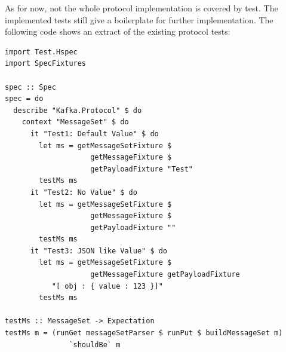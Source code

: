 As for now, not the whole protocol implementation is
covered by test. The implemented tests still give a boilerplate for further
implementation. The following code shows an extract of the existing protocol tests:
\begin{lstlisting}[caption={Extract from protocol tests with hspec}]
import Test.Hspec
import SpecFixtures

spec :: Spec
spec = do
  describe "Kafka.Protocol" $ do
    context "MessageSet" $ do
      it "Test1: Default Value" $ do
        let ms = getMessageSetFixture $ 
                    getMessageFixture $ 
                    getPayloadFixture "Test"
        testMs ms
      it "Test2: No Value" $ do
        let ms = getMessageSetFixture $ 
                    getMessageFixture $ 
                    getPayloadFixture ""
        testMs ms
      it "Test3: JSON like Value" $ do
        let ms = getMessageSetFixture $ 
                    getMessageFixture getPayloadFixture
           "[ obj : { value : 123 }]"
        testMs ms

testMs :: MessageSet -> Expectation
testMs m = (runGet messageSetParser $ runPut $ buildMessageSet m)
               `shouldBe` m

\end{lstlisting}

